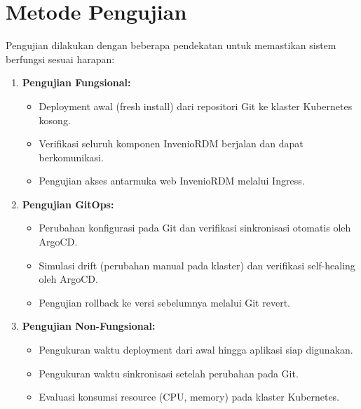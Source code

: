 \section{Metode Pengujian}

Pengujian dilakukan dengan beberapa pendekatan untuk memastikan sistem berfungsi sesuai harapan:

\begin{enumerate}
    \item \textbf{Pengujian Fungsional:}
    \begin{itemize}
        \item Deployment awal (fresh install) dari repositori Git ke klaster Kubernetes kosong.
        \item Verifikasi seluruh komponen InvenioRDM berjalan dan dapat berkomunikasi.
        \item Pengujian akses antarmuka web InvenioRDM melalui Ingress.
    \end{itemize}
    
    \item \textbf{Pengujian GitOps:}
    \begin{itemize}
        \item Perubahan konfigurasi pada Git dan verifikasi sinkronisasi otomatis oleh ArgoCD.
        \item Simulasi drift (perubahan manual pada klaster) dan verifikasi self-healing oleh ArgoCD.
        \item Pengujian rollback ke versi sebelumnya melalui Git revert.
    \end{itemize}
    
    \item \textbf{Pengujian Non-Fungsional:}
    \begin{itemize}
        \item Pengukuran waktu deployment dari awal hingga aplikasi siap digunakan.
        \item Pengukuran waktu sinkronisasi setelah perubahan pada Git.
        \item Evaluasi konsumsi resource (CPU, memory) pada klaster Kubernetes.
    \end{itemize}
\end{enumerate}
